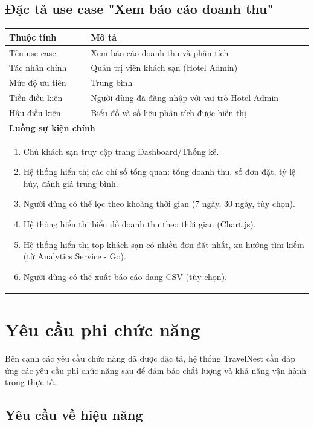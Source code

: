 \documentclass[13pt,a4paper,twoside]{report}
\begin{document}
\subsection{Đặc tả use case "Xem báo cáo doanh thu"}

\begin{longtable}{p{3.5cm} p{11.5cm}}
  \toprule
  \textbf{Thuộc tính} & \textbf{Mô tả} \\
  \midrule
  Tên use case & Xem báo cáo doanh thu và phân tích \\
  Tác nhân chính & Quản trị viên khách sạn (Hotel Admin) \\
  Mức độ ưu tiên & Trung bình \\
  \midrule
  Tiền điều kiện & Người dùng đã đăng nhập với vai trò Hotel Admin \\
  \midrule
  Hậu điều kiện & Biểu đồ và số liệu phân tích được hiển thị \\
  \midrule
  \multicolumn{2}{p{15cm}}{\textbf{Luồng sự kiện chính}} \\
  \midrule
  \multicolumn{2}{p{15cm}}{%
    \begin{enumerate}[nosep]
      \item Chủ khách sạn truy cập trang Dashboard/Thống kê.
      \item Hệ thống hiển thị các chỉ số tổng quan: tổng doanh thu, số đơn đặt, tỷ lệ hủy, đánh giá trung bình.
      \item Người dùng có thể lọc theo khoảng thời gian (7 ngày, 30 ngày, tùy chọn).
      \item Hệ thống hiển thị biểu đồ doanh thu theo thời gian (Chart.js).
      \item Hệ thống hiển thị top khách sạn có nhiều đơn đặt nhất, xu hướng tìm kiếm (từ Analytics Service - Go).
      \item Người dùng có thể xuất báo cáo dạng CSV (tùy chọn).
    \end{enumerate}
  } \\
  \bottomrule
\end{longtable}

\section{Yêu cầu phi chức năng}

Bên cạnh các yêu cầu chức năng đã được đặc tả, hệ thống TravelNest cần đáp ứng các yêu cầu phi chức năng sau để đảm bảo chất lượng và khả năng vận hành trong thực tế.

\subsection{Yêu cầu về hiệu năng}
\end{document}
